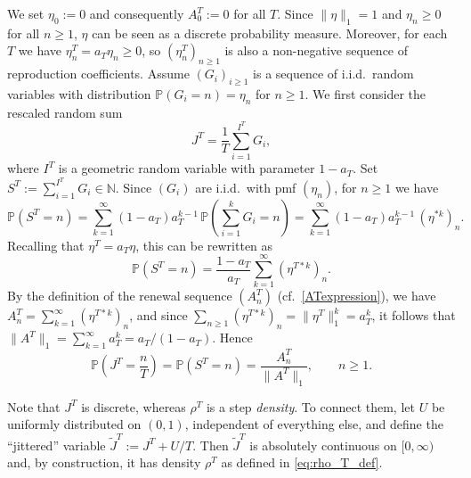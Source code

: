 \documentclass[letterpaper]{article}
\numberwithin{equation}{section}
\theoremstyle{definition}
\theoremstyle{remark}
\begin{document}
  {We set $\eta_0:=0$ and consequently $A_0^T:=0$ for all $T$.} Since $\|\eta\|_1=1$ {and $\eta_n\ge0$ for all $n\ge1$}, $\eta$ can be seen as a discrete probability measure. {Moreover, for each $T$ we have $\eta_n^T=a_T\eta_n\ge0$, so $(\eta_n^T)_{n\ge1}$ is also a non-negative sequence of reproduction coefficients.}
  Assume $(G_i)_{i\ge1}$ is a sequence of i.i.d.\ random variables with distribution $\mathbb P(G_i=n)=\eta_n$ for $n\ge1$. We first consider the rescaled random sum
  \[
    J^T=\frac1{T}\sum_{i=1}^{I^T}G_i,
  \]
  where $I^T$ is a geometric random variable with parameter $1-a_T$. {Set $S^T:=\sum_{i=1}^{I^T}G_i\in\mathbb{N}$. Since $(G_i)$ are i.i.d.\ with pmf $(\eta_n)$, for $n\ge1$ we have}
  \begin{equation*}
  {
  \mathbb{P}(S^T=n)
  =\sum_{k=1}^\infty (1-a_T)a_T^{k-1}\,\mathbb{P}\!\left(\sum_{i=1}^k G_i=n\right)
  =\sum_{k=1}^\infty (1-a_T)a_T^{k-1}\,(\eta^{*k})_n.}
  \end{equation*}
  {Recalling that $\eta^T=a_T\eta$, this can be rewritten as}
  \begin{equation*}
  {
  \mathbb{P}(S^T=n)=\frac{1-a_T}{a_T}\sum_{k=1}^\infty (\eta^{T* k})_n.}
  \end{equation*}
  {By the definition of the renewal sequence $(A_n^T)$ (cf.\ \eqref{ATexpression}), we have $A_n^T=\sum_{k=1}^\infty (\eta^{T* k})_n$, and since $\sum_{n\ge1}(\eta^{T* k})_n=\|\eta^T\|_1^k=a_T^k$, it follows that $\|A^T\|_1=\sum_{k=1}^\infty a_T^k=a_T/(1-a_T)$. Hence}
  \begin{equation*}
  {
  \mathbb{P}\!\left(J^T=\frac{n}{T}\right)=\mathbb{P}(S^T=n)=\frac{A_n^T}{\|A^T\|_1},\qquad n\ge1.}
  \end{equation*}

  {Note that $J^T$ is discrete, whereas $\rho^T$ is a step \emph{density}. To connect them, let $U$ be uniformly distributed on $(0,1)$, independent of everything else, and define the ``jittered'' variable $\widetilde J^T:=J^T+U/T$. Then $\widetilde J^T$ is absolutely continuous on $[0,\infty)$ and, by construction, it has density $\rho^T$ as defined in \eqref{eq:rho_T_def}.}
\end{document}
